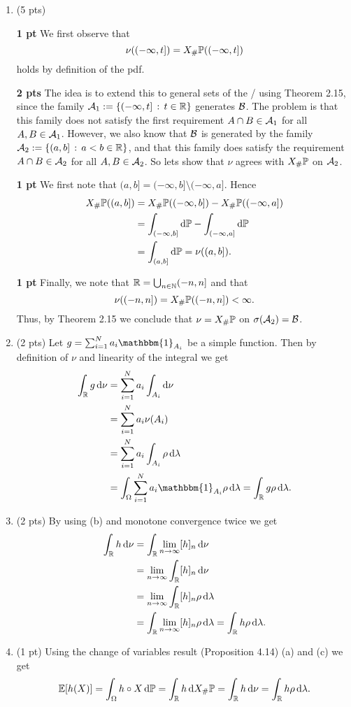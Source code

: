 \begin{enumerate}[label=(\alph*)]
\item (5 pts) 

\textbf{1 pt} We first observe that 
\[
	\nu((-\infty,t]) = X_\# \mathbb P((-\infty,t])
\]
holds by definition of the pdf. 


\textbf{2 pts} The idea is to extend this to general sets of the \sigalg/ using Theorem 2.15, since the family $\mathcal A_1 := \{(-\infty, t] \, : \, t \in \mathbb R\}$ generates $\mathcal B$. The problem is that this family does not satisfy the first requirement $A \cap B \in \mathcal A_1$ for all $A, B \in \mathcal A_1$. However, we also know that $\mathcal B$ is generated by the family $\mathcal A_2 := \{(a,b] \, : \, a < b \in \mathbb R\}$, and that this family does satisfy the requirement $A \cap B \in \mathcal A_2$ for all $A, B \in \mathcal A_2$. So lets show that $\nu$ agrees with $X_\# \mathbb P$ on $\mathcal A_2$.

\textbf{1 pt}
We first note that $(a,b] = (-\infty,b] \setminus (-\infty,a]$. Hence
\begin{align*}
	X_\# \mathbb P((a,b]) &= X_\# \mathbb P((-\infty, b]) - X_\# \mathbb P((-\infty, a]) \\
	&= \int_{(-\infty, b]} \mathrm{d} \mathbb P - \int_{(-\infty, a]} \mathrm{d} \mathbb P \\
	&= \int_{(a,b]} \mathrm{d} \mathbb P = \nu((a,b]).
\end{align*}

\textbf{1 pt}
Finally, we note that $\mathbb R = \bigcup_{n \in \mathbb N} (-n,n]$ and that
\[
	\nu((-n,n]) = X_\# \mathbb P((-n,n]) < \infty. 
\]
Thus, by Theorem 2.15 we conclude that $\nu = X_\# \mathbb P$ on $\sigma(\mathcal A_2) = \mathcal B$.

\item (2 pts) Let $g = \sum_{i = 1}^N a_i \mathbbm{1}_{A_i}$ be a simple function. Then by definition of $\nu$ and linearity of the integral we get
\begin{align*}
	\int_\bbR g \, \dd \nu &= \sum_{i = 1}^N a_i \int_{A_i} \dd \nu\\
	&= \sum_{i = 1}^N a_i \nu(A_i) \\ 
	&= \sum_{i = 1}^N a_i \int_{A_i} \rho \, \dd \lambda \\
	&= \int_{\Omega} \sum_{i = 1}^N a_i \mathbbm{1}_{A_i} \rho \, \dd \lambda
	= \int_\bbR g \rho \, \dd \lambda.
\end{align*}
\item (2 pts) By using (b) and monotone convergence twice we get
\begin{align*}
	\int_{\mathbb R} h \, \mathrm{d} \nu &= \int_{\mathbb R} \lim_{n \to \infty} [h]_n \, \mathrm{d} \nu \\
	&= \lim_{n \to \infty} \int_{\mathbb R} [h]_n \, \mathrm{d} \nu \\
	&= \lim_{n \to \infty} \int_{\mathbb R} [h]_n \rho \, \mathrm{d} \lambda \\
	&= \int_{\mathbb R} \lim_{n \to \infty} [h]_n \rho \, \mathrm{d} \lambda = \int_{\mathbb R} h \rho \, \mathrm{d} \lambda.
\end{align*}
\item (1 pt) Using the change of variables result (Proposition 4.14) (a) and (c) we get
\[
	\mathbb E[h(X)] = \int_\Omega h \circ X \, \mathrm{d} \mathbb P 
	= \int_{\mathbb R} h \, \mathrm{d} X_\# \mathbb P = \int_{\mathbb R} h \, \mathrm{d} \nu 
	= \int_{\mathbb R} h \rho \, \mathrm{d} \lambda.
\]
\end{enumerate}

